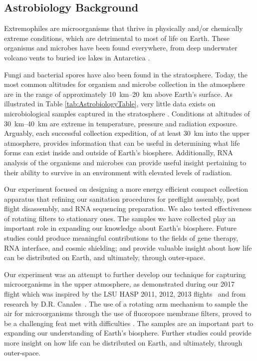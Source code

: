 \subsection{Astrobiology Background}
\label{sec:Astrobiology-Background}
Extremophiles are microorganisms that thrive in physically and/or chemically extreme conditions, which are detrimental to most of life on Earth. These organisms and microbes have been found everywhere, from deep underwater volcano vents to buried ice lakes in Antarctica \cite{Extremophiles}. 

Fungi and bacterial spores have also been found in the stratosphere. Today, the most common altitudes for organism and microbe collection in the atmosphere are in the range of approximately \SIrange{10}{20}{\kilo\meter} above Earth’s surface. As illustrated in Table \ref{tab:AstrobiologyTable}, very little data exists on microbiological samples captured in the stratosphere \cite{Extremophiles}. Conditions at altitudes of \SIrange{30}{40}{\kilo\meter} are extreme in temperature, pressure and radiation exposure. Arguably, each successful collection expedition, of at least \SI{30}{\kilo\meter} into the upper atmosphere, provides information that can be useful in determining what life forms can exist inside and outside of Earth’s biosphere. Additionally, RNA analysis of the organisms and microbes can provide useful insight pertaining to their ability to survive in an environment with elevated levels of radiation.  

Our experiment focused on designing a more energy efficient compact collection apparatus that refining our sanitation procedures for preflight assembly, post flight disassembly, and RNA sequencing preparation. We also tested effectiveness of rotating filters to stationary ones. The samples we have collected play an important role in expanding our knowledge about Earth’s biosphere. Future studies could produce meaningful contributions to the fields of gene therapy, RNA interface, and cosmic shielding; and provide valuable insight about how life can be distributed on Earth, and ultimately, through outer-space.


Our experiment was an attempt to further develop our technique for capturing microorganisms in the upper atmosphere, as demonstrated during our 2017~\cite{SORA1} flight which was inspired by the LSU HASP 2011, 2012, 2013 flights~\cite{LSU} and from research by D.R. Canales~\cite{Canales}.  The use of a rotating arm mechanism to sample the air for microorganisms through the use of fluoropore membrane filters, proved to be a challenging feat met with difficulties . The samples are an important part to expanding our understanding of Earth's biosphere. Further studies could provide more insight on how life can be distributed on Earth, and ultimately, through outer-space.

